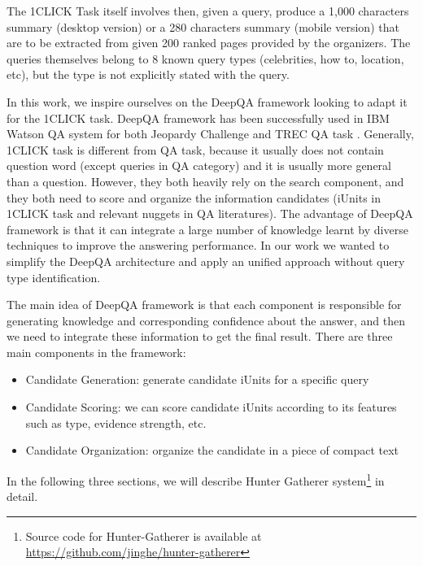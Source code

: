 The 1CLICK Task itself involves then, given a query, produce a 1,000
characters summary (desktop version) or a 280 characters summary
(mobile version) that are to be extracted from given 200 ranked pages
provided by the organizers. The queries themselves belong to 8 known
query types (celebrities, how to, location, etc), but the type is not
explicitly stated with the query.


In this work, we inspire ourselves on the DeepQA framework looking to adapt it for the 1CLICK task.
DeepQA framework has been successfully used in IBM Watson QA system for both Jeopardy Challenge and TREC QA task \cite{ferrucci_etal_AI10}.
Generally, 1CLICK task is different from QA task, because it usually does not contain question word (except queries in QA category) and it is usually more general than a question.
However, they both heavily rely on the search component, and they both need to score and organize the information candidates (iUnits in 1CLICK task and relevant nuggets in QA literatures).
The advantage of DeepQA framework is that it can integrate a large number of knowledge learnt by diverse techniques to improve the answering performance. In our work we wanted to simplify the DeepQA architecture and apply an unified approach without query type identification.

The main idea of DeepQA framework is that each component is responsible for generating knowledge and corresponding confidence about the answer, and then we need to integrate these information to get the final result.
There are three main components in the framework:

\begin{itemize}
\item Candidate Generation: generate candidate iUnits for a specific query
\item Candidate Scoring: we can score candidate iUnits according to its features such as type, evidence strength, etc.
\item Candidate Organization: organize the candidate in a piece of compact text
\end{itemize}

In the following three sections, we will describe Hunter Gatherer system\footnote{Source code for Hunter-Gatherer is available at \url{https://github.com/jinghe/hunter-gatherer}} in detail.

